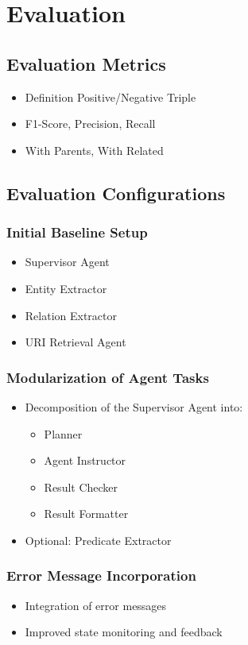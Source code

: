 \documentclass[a4paper,oneside,bibliography=totoc]{scrbook}
\begin{document}
\chapter{Evaluation}
\section{Evaluation Metrics}
\begin{itemize}
  \item Definition Positive/Negative Triple \cite{Josifoski2021}
  \item F1-Score, Precision, Recall
  \item With Parents, With Related
\end{itemize}


\section{Evaluation Configurations}
\subsection{Initial Baseline Setup}
\begin{itemize}
  \item Supervisor Agent
  \item Entity Extractor
  \item Relation Extractor
  \item URI Retrieval Agent
\end{itemize}

\subsection{Modularization of Agent Tasks}
\begin{itemize}
  \item Decomposition of the Supervisor Agent into:
        \begin{itemize}
          \item Planner
          \item Agent Instructor
          \item Result Checker
          \item Result Formatter
        \end{itemize}
  \item Optional: Predicate Extractor
\end{itemize}

\subsection{Error Message Incorporation}
\begin{itemize}
  \item Integration of error messages
  \item Improved state monitoring and feedback
\end{itemize}
\end{document}
